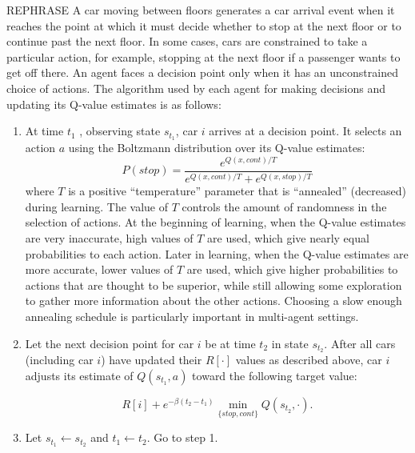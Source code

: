 {\color{red} REPHRASE}
A car moving between floors generates a car arrival event when it reaches the point at which it must decide whether to stop at the next floor or to continue past the next floor. In some cases, cars are constrained to take a particular action, for example, stopping at the next floor if a passenger wants to get off there. An agent faces a decision point only when it has an unconstrained choice of actions. The algorithm used by each agent for making decisions and updating its Q-value estimates is as follows:
\begin{enumerate}
    \item At time $t_1$ , observing state $s_{t_1}$, car $i$ arrives at a decision point. It selects an action $a$ using the Boltzmann distribution over its Q-value estimates:
    \[
        P(stop) = \frac{e^{Q(x,cont)/T}}{e^{Q(x,cont)/T} + e^{Q(x,stop)/T}}
    \]
    where $T$ is a positive “temperature” parameter that is “annealed” (decreased) during learning. The value of $T$ controls the amount of randomness in the selection of actions. At the beginning of learning, when the Q-value estimates are very inaccurate, high values of $T$ are used, which give nearly equal probabilities to each action. Later in learning, when the Q-value estimates are more accurate, lower values of $T$ are used, which give higher probabilities to actions that are thought to be superior, while still allowing some exploration to gather more information about the other actions. Choosing a slow enough annealing schedule is particularly
    important in multi-agent settings.
    
    \item Let the next decision point for car $i$ be at time $t_2$ in state $s_{t_2}$. After all cars (including car $i$) have updated their $R[\cdot]$ values as described above, car $i$ adjusts its estimate of $Q(s_{t_1}, a)$ toward the following target value:

    \[
    R[i] + e^{-\beta(t_2 - t_1)} \min\limits_{\{stop, cont\}} Q(s_{t_2}, \cdot).    
    \]

    \item
    Let $s_{t_1} \leftarrow s_{t_2}$ and $t_1 \leftarrow t_2$. Go to step 1.

\end{enumerate}
